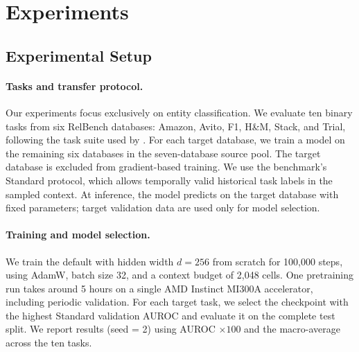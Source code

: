 \section{Experiments}
\label{sec:result}

\subsection{Experimental Setup}
\label{sec:setup}

\paragraph{Tasks and transfer protocol.}
Our experiments focus exclusively on entity classification. We evaluate ten
binary tasks from six RelBench databases:
Amazon, Avito, F1, H\&M, Stack, and Trial, following the task suite used by
\RT{} \citep{ranjan2026rt}. For each target database, we train a model on the
remaining six databases in the seven-database source pool. The target database
is excluded from gradient-based training. We use the benchmark's Standard
protocol, which allows temporally valid historical task labels in the sampled
context. At inference, the model predicts on the target database with fixed
parameters; target validation data are used only for model selection.

\paragraph{Training and model selection.}
We train the default \model{} with hidden width $d=256$ from scratch for 100,000 steps,
using AdamW, batch size 32, and a context budget of 2,048 cells. One pretraining run takes around 5 hours on a single AMD Instinct MI300A accelerator, including periodic validation. For each target task, we select the checkpoint with the highest Standard validation AUROC and evaluate it on the complete test split. We report results (seed = 2) using AUROC $\times100$ and the macro-average across the ten tasks.

